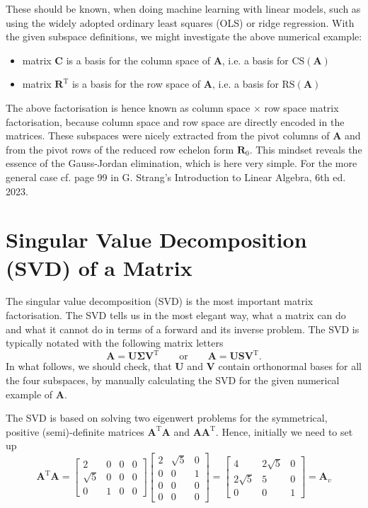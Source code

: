 \documentclass[a4paper, 11pt]{scrartcl}
\begin{document}
These should be known, when doing machine learning with linear models, such as using the widely adopted ordinary least squares (OLS) or ridge regression.
%
\newpage
%
With the given subspace definitions, we might investigate the above numerical example:
\begin{itemize}
\item matrix $\bm{C}$ is a basis for the column space of $\bm{A}$, i.e. a basis for $\text{CS}(\bm{A})$
\item matrix $\bm{R}^\mathrm{T}$ is a basis for the row space of $\bm{A}$, i.e. a basis for $\text{RS}(\bm{A})$
\end{itemize}
The above factorisation is hence known as column space $\times$ row space matrix factorisation,
because column space and row space are directly encoded in the matrices.
These subspaces were nicely extracted from the pivot columns of $\bm{A}$ and
from the pivot rows of the reduced row echelon form $\bm{R}_0$.
This mindset reveals the essence of the Gauss-Jordan elimination, which is here very simple.
For the more general case cf. page 99 in G. Strang's Introduction to Linear Algebra, 6th ed. 2023.

\section{Singular Value Decomposition (SVD) of a Matrix}
The singular value decomposition (SVD) is the most important matrix factorisation.
The SVD tells us in the most elegant way, what a matrix can do and what it cannot do in terms of a
forward and its inverse problem.
The SVD is typically notated with the following matrix letters
$$
\bm{A} = \bm{U} \bm{\Sigma} \bm{V}^\mathrm{T} \qquad\text{or}\qquad
\bm{A} = \bm{U} \bm{S} \bm{V}^\mathrm{T}.
$$
In what follows, we should check, that $\bm{U}$ and $\bm{V}$ contain orthonormal bases for all the four subspaces, by manually calculating the SVD for the given numerical example of $\bm{A}$.

The SVD is based on solving two eigenwert problems for the symmetrical, positive (semi)-definite matrices $\bm{A}^\mathrm{T} \bm{A}$ and $\bm{A} \bm{A}^\mathrm{T}$. Hence, initially we need to set up
$$
\bm{A}^\mathrm{T} \bm{A} =
\begin{bmatrix}
2 & 0 & 0 & 0\\
\sqrt{5} & 0 & 0  & 0\\
0 & 1 & 0 & 0
\end{bmatrix}
\begin{bmatrix}
2 & \sqrt{5} & 0\\
0 & 0 & 1\\
0 & 0 & 0\\
0 & 0 & 0
\end{bmatrix}
=
\begin{bmatrix}
4 & 2 \sqrt{5} & 0\\
2 \sqrt{5} & 5 & 0\\
0 & 0 & 1
\end{bmatrix}
=\bm{A}_v
$$
\end{document}
